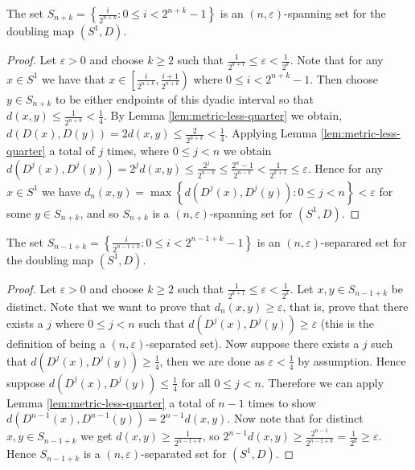 \begin{prop} \label{prop:spanning-set}
    The set $S_{n+k} = \left\lbrace \frac{i}{2^{n+k}} : 0 \leq i < 2^{n+k} - 1 \right\rbrace$ is an $(n, \varepsilon)$-spanning set for the doubling map $(S^1, D)$. 
    \begin{proof}
        Let $\varepsilon > 0$ and choose $k \geq 2$ such that $\frac{1}{2^{k+1}} \leq \varepsilon < \frac{1}{2^k}$. Note that for any $x \in S^1$ we have that $x \in \left[\frac{i}{2^{n+k}}, \frac{i + 1}{2^{n+k}}\right)$ where $0 \leq i < 2^{n+k} - 1$. Then choose $y \in S_{n+k}$ to be either endpoints of this dyadic interval so that $d(x, y) \leq \frac{1}{2^{n+k}} < \frac{1}{4}$. By Lemma \ref{lem:metric-less-quarter} we obtain, $d(D(x), D(y)) = 2d(x, y) \leq \frac{2}{2^{n+k}} < \frac{1}{4}$. Applying Lemma \ref{lem:metric-less-quarter} a total of $j$ times, where $0 \leq j < n$ we obtain $d(D^j(x), D^j(y)) = 2^jd(x, y) \leq \frac{2^j}{2^{n - k}} \leq \frac{2^n - 1}{2^{n - k}} < \frac{1}{2^{k + 1}} \leq \varepsilon$. Hence for any $x \in S^1$ we have $d_n(x, y) = \max{\left\lbrace d(D^j(x), D^j(y)) : 0 \leq j < n \right\rbrace} < \varepsilon$ for some $y \in S_{n + k}$, and so $S_{n+k}$ is a $(n, \varepsilon)$-spanning set for $(S^1, D)$.
    \end{proof}
\end{prop}

\begin{prop} \label{prop:separared-set}
    The set $S_{n-1+k} = \left\lbrace \frac{i}{2^{n-1+k}} : 0 \leq i < 2^{n - 1 + k} - 1 \right\rbrace$ is an $(n, \varepsilon)$-separared set for the doubling map $(S^1, D)$. 
    \begin{proof}
        Let $\varepsilon > 0$ and choose $k \geq 2$ such that $\frac{1}{2^{k+1}} \leq \varepsilon < \frac{1}{2^k}$. Let $x, y \in S_{n-1+k}$ be distinct. Note that we want to prove that $d_n(x, y) \geq \varepsilon$, that is, prove that there exists a $j$ where $0 \leq j < n$ such that $d(D^j(x), D^j(y)) \geq \varepsilon$ (this is the definition of being a $(n, \varepsilon)$-separated set). Now suppose there exists a $j$ such that $d(D^j(x), D^j(y)) \geq \frac{1}{4}$, then we are done as $\varepsilon < \frac{1}{4}$ by assumption. Hence suppose $d(D^j(x), D^j(y)) \leq \frac{1}{4}$ for all $0 \leq j < n$. Therefore we can apply Lemma \ref{lem:metric-less-quarter} a total of $n - 1$ times to show $d(D^{n-1}(x), D^{n-1}(y)) = 2^{n-1}d(x, y)$. Now note that for distinct $x, y \in S_{n-1+k}$ we get $d(x, y) \geq \frac{1}{2^{n-1+k}}$, so $2^{n-1}d(x, y) \geq \frac{2^{n-1}}{2^{n-1+k}} = \frac{1}{2^k} \geq \varepsilon$. Hence $S_{n-1+k}$ is a $(n, \varepsilon)$-separated set for $(S^1, D)$.
    \end{proof}
\end{prop}


